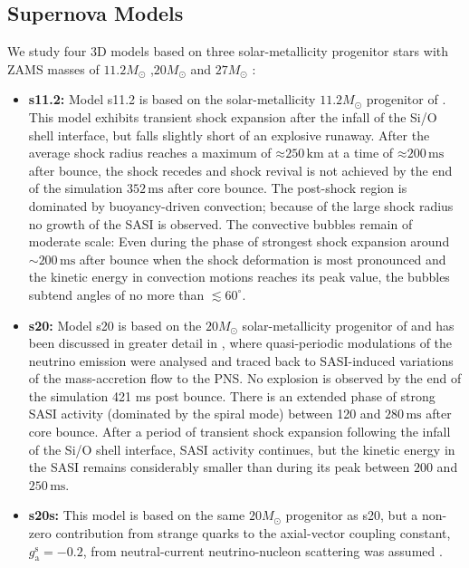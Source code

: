 \subsection{Supernova Models}
We study four 3D models based on three solar-metallicity progenitor stars with ZAMS masses of $11.2 M_\odot$ \citep{woosley_02},$20 M_\odot$ \citep{woosley_07} and $27 M_\odot$ \citep{woosley_02}: 
\begin{itemize}
\item \textbf{s11.2:} 
Model s11.2 \citep{tamborra_14a} is based on the solar-metallicity $11.2 M_\odot$ progenitor of \citet{woosley_02}. 
This model exhibits transient shock expansion after
the infall of the Si/O shell interface, but falls slightly short of
an explosive runaway.  After the average shock radius reaches
a maximum of $\mathord{\approx} 250 \, \mathrm{km}$ at a time
of $\mathord{\approx} 200 \, \mathrm{ms}$ after bounce, the shock recedes 
and shock revival is not achieved by the end of the simulation $352 \, \mathrm{ms}$ after core bounce.
The post-shock region is dominated by buoyancy-driven convection; because of the large shock radius
no growth of the SASI is observed. The convective bubbles remain of moderate
scale: Even during the phase of strongest shock expansion around
$\mathord{\sim} 200 \, \mathrm{ms}$ after bounce when the shock deformation
is most pronounced and the kinetic energy in convection motions reaches
its peak value, the bubbles subtend
angles of no more than $\lesssim 60^\circ$.
\item \textbf{s20:}
Model s20 is based on the $20 M_{\odot}$  solar-metallicity progenitor
of \citet{woosley_07} and has been discussed in greater
detail in \citet{tamborra_13,tamborra_14b}, where quasi-periodic modulations of the neutrino
emission were analysed and traced back to SASI-induced variations of the mass-accretion flow to the PNS. 
No explosion is observed by the end of the simulation 421 ms post bounce.
There is an extended phase of strong SASI activity (dominated by the spiral mode) 
between 120 and $280 \, \mathrm{ms}$ after core bounce. After a period
of transient shock expansion following the infall of the Si/O shell
interface, SASI activity continues,
but the kinetic energy in the SASI remains considerably
smaller than during its peak between $200$ and $250 \, \mathrm{ms}$.
\item \textbf{s20s:} This model is based on the same $20 M_\odot$
progenitor as s20, but a non-zero contribution from
strange quarks to the axial-vector coupling constant,
$g_\mathrm{a}^\mathrm{s}=-0.2$, from neutral-current neutrino-nucleon scattering was assumed \citep{melson_15b}.

\end{itemize}
